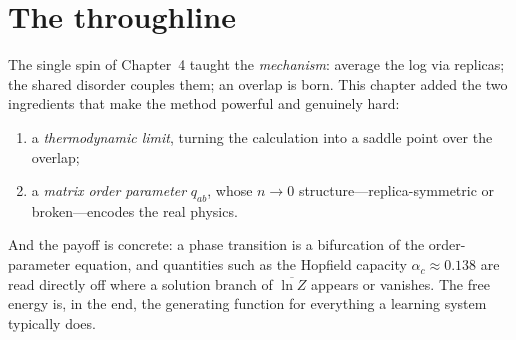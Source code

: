 \documentclass[nobib,justified]{tufte-handout}
\newcommand{\dbar}[1]{\overline{#1}}
\begin{document}
\section{The throughline}

The single spin of Chapter~4 taught the \emph{mechanism}: average the log
via replicas; the shared disorder couples them; an overlap is born. This
chapter added the two ingredients that make the method powerful and
genuinely hard:
\begin{enumerate}
\item a \emph{thermodynamic limit}, turning the calculation into a saddle
  point over the overlap;
\item a \emph{matrix order parameter} $q_{ab}$, whose $n\to0$
  structure---replica-symmetric or broken---encodes the real physics.
\end{enumerate}
And the payoff is concrete: a phase transition is a bifurcation of the
order-parameter equation, and quantities such as the Hopfield capacity
$\alpha_c\approx0.138$ are read directly off where a solution branch of
$\dbar{\ln Z}$ appears or vanishes. The free energy is, in the end, the
generating function for everything a learning system typically does.
\end{document}
